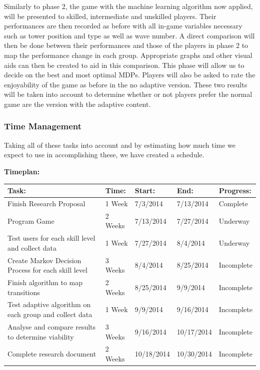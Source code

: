 \documentclass[11pt]{article}
\begin{document}
Similarly to phase 2, the game with the machine learning algorithm now applied, will be presented to skilled, intermediate and unskilled players. Their performances are then recorded as before with all in-game variables necessary such as tower position and type as well as wave number. A direct comparison will then be done between their performances and those of the players in phase 2 to map the performance change in each group. Appropriate graphs and other visual aids can then be created to aid in this comparison. This phase will allow us to decide on the best and most optimal MDPs. Players will also be asked to rate the enjoyability of the game as before in the no adaptive version. These two results will be taken into account to determine whether or not players prefer the normal game are the version with the adaptive content.
\vspace{6.0 mm}
\clearpage
\subsubsection{Time Management}
Taking all of these tasks into account and by estimating how much time we expect to use in accomplishing these, we have created a schedule.
\vspace{6.0 mm}

\textbf{Timeplan:}
\begin{center}
	\begin{tabular}{ | p{6cm} | p{2cm} | p{2cm} | p{2cm} | p{2cm} |}
		\hline
		Task: & Time:       & Start:   & End: & Progress: \\ \hline 
		Finish Research Proposal & 1 Week & 7/3/2014 & 7/13/2014 & Complete  \\ \hline 
		Program Game & 2 Weeks & 7/13/2014 & 7/27/2014 & Underway  \\ \hline 
		Test users for each skill level and collect data & 1 Week & 7/27/2014 & 8/4/2014 & Underway  \\ \hline 
		Create Markov Decision Process for each skill level
 & 3 Weeks & 8/4/2014 & 8/25/2014 & Incomplete  \\ \hline 
		Finish algorithm to map transitions
& 2 Weeks & 8/25/2014 & 9/9/2014 & Incomplete  \\ \hline 
		Test adaptive algorithm on each group and collect data
 & 1 Week & 9/9/2014 & 9/16/2014 & Incomplete  \\ \hline 
		Analyse and compare results to determine viability
 & 3 Weeks & 9/16/2014 & 10/17/2014 & Incomplete \\ \hline 
 Complete research document
 & 2 Weeks & 10/18/2014 & 10/30/2014 & Incomplete \\ \hline 
	\end{tabular}
\end{center}
\vspace{6.0 mm}
\end{document}
